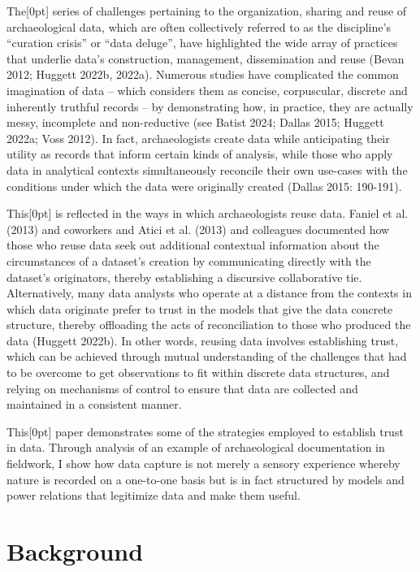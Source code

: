 \documentclass[
]{article}
\newcommand{\paragraphnumber}[1]{\marginnote{\color{lightgray}\tiny{#1}}[0pt]}
\begin{document}
The\paragraphnumber{[1]} series of challenges pertaining to the
organization, sharing and reuse of archaeological data, which are often
collectively referred to as the discipline's ``curation crisis'' or
``data deluge'', have highlighted the wide array of practices that
underlie data's construction, management, dissemination and reuse (Bevan
2012; Huggett 2022b, 2022a). Numerous studies have complicated the
common imagination of data -- which considers them as concise,
corpuscular, discrete and inherently truthful records -- by
demonstrating how, in practice, they are actually messy, incomplete and
non-reductive (see Batist 2024; Dallas 2015; Huggett 2022a; Voss 2012).
In fact, archaeologists create data while anticipating their utility as
records that inform certain kinds of analysis, while those who apply
data in analytical contexts simultaneously reconcile their own use-cases
with the conditions under which the data were originally created (Dallas
2015: 190-191).

This\paragraphnumber{[2]} is reflected in the ways in which
archaeologists reuse data. Faniel et al. (2013) and coworkers and Atici
et al. (2013) and colleagues documented how those who reuse data seek
out additional contextual information about the circumstances of a
dataset's creation by communicating directly with the dataset's
originators, thereby establishing a discursive collaborative tie.
Alternatively, many data analysts who operate at a distance from the
contexts in which data originate prefer to trust in the models that give
the data concrete structure, thereby offloading the acts of
reconciliation to those who produced the data (Huggett 2022b). In other
words, reusing data involves establishing trust, which can be achieved
through mutual understanding of the challenges that had to be overcome
to get observations to fit within discrete data structures, and relying
on mechanisms of control to ensure that data are collected and
maintained in a consistent manner.

This\paragraphnumber{[3]} paper demonstrates some of the strategies
employed to establish trust in data. Through analysis of an example of
archaeological documentation in fieldwork, I show how data capture is
not merely a sensory experience whereby nature is recorded on a
one-to-one basis but is in fact structured by models and power relations
that legitimize data and make them useful.

\section{Background}\label{background}
\end{document}
